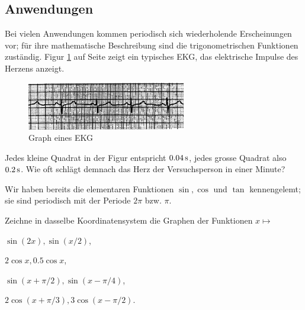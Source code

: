 \documentclass[%
11pt,%
twoside,%
titlepage,%
german,%
headsepline%
]{scrartcl}
\begin{document}
\subsection{Anwendungen}
Bei
vielen Anwendungen kommen periodisch sich wiederholende Erscheinungen vor; für ihre mathematische Beschreibung sind die trigonometrischen Funktionen zuständig. Figur \ref{ekg} auf Seite \pageref{ekg} zeigt ein typisches EKG, das elektrische Impulse des Herzens anzeigt.

\begin{figure}
\begin{center}
\includegraphics[width=0.618\textwidth]{pictures/ekg}
\end{center}
\caption{Graph eines EKG}\label{ekg}
\end{figure}

\begin{ueb}[EKG]
Jedes kleine Quadrat in der Figur entspricht $\unit[0.04]{s}$, jedes grosse Quadrat also $\unit[0.2]{s}$. Wie oft schlägt demnach das Herz der Versuchsperson in einer Minute?
\end{ueb}

Wir haben bereits die elementaren Funktionen $\sin, \cos$ und $\tan$ kennengelemt; sie sind periodisch mit der Periode $2\pi$ bzw. $\pi$.

\begin{ueb}
Zeichne in dasselbe Koordinatensystem die Graphen der Funktionen $x\mapsto$
\begin{enumeratea}
\item $\sin(2x), \sin(x/2)$,
\item $2\cos x, 0.5\cos x$,
\item $\sin(x + \pi/2), \sin(x - \pi/4)$,
\item $2\cos(x + \pi/3), 3\cos(x - \pi/2)$.
\end{enumeratea}
\end{ueb}
\end{document}

